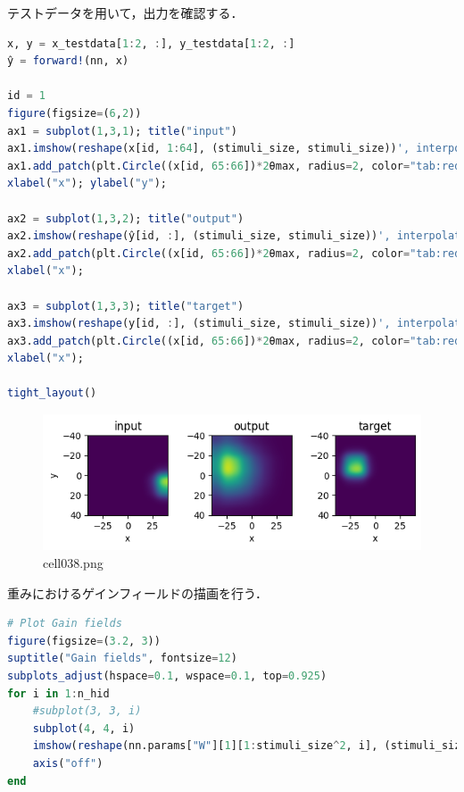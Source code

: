 テストデータを用いて，出力を確認する．
\begin{lstlisting}[language=julia]
x, y = x_testdata[1:2, :], y_testdata[1:2, :]
ŷ = forward!(nn, x)

id = 1
figure(figsize=(6,2))
ax1 = subplot(1,3,1); title("input")
ax1.imshow(reshape(x[id, 1:64], (stimuli_size, stimuli_size))', interpolation="gaussian", extent=[-θmax, θmax, θmax, -θmax])
ax1.add_patch(plt.Circle((x[id, 65:66])*2θmax, radius=2, color="tab:red", fill=false))
xlabel("x"); ylabel("y");

ax2 = subplot(1,3,2); title("output")
ax2.imshow(reshape(ŷ[id, :], (stimuli_size, stimuli_size))', interpolation="gaussian", extent=[-θmax, θmax, θmax, -θmax])
ax2.add_patch(plt.Circle((x[id, 65:66])*2θmax, radius=2, color="tab:red", fill=false))
xlabel("x");

ax3 = subplot(1,3,3); title("target")
ax3.imshow(reshape(y[id, :], (stimuli_size, stimuli_size))', interpolation="gaussian", extent=[-θmax, θmax, θmax, -θmax])
ax3.add_patch(plt.Circle((x[id, 65:66])*2θmax, radius=2, color="tab:red", fill=false))
xlabel("x");

tight_layout()
\end{lstlisting}
\begin{figure}[ht]
	\centering
	\includegraphics[scale=0.8, max width=\linewidth]{./fig/solve-credit-assignment-problem/backpropagation/cell038.png}
	\caption{cell038.png}
	\label{cell038.png}
\end{figure}
重みにおけるゲインフィールドの描画を行う．
\begin{lstlisting}[language=julia]
# Plot Gain fields
figure(figsize=(3.2, 3))
suptitle("Gain fields", fontsize=12)
subplots_adjust(hspace=0.1, wspace=0.1, top=0.925)
for i in 1:n_hid
    #subplot(3, 3, i)
    subplot(4, 4, i)
    imshow(reshape(nn.params["W"][1][1:stimuli_size^2, i], (stimuli_size, stimuli_size)), cmap="hot")
    axis("off")
end
\end{lstlisting}
